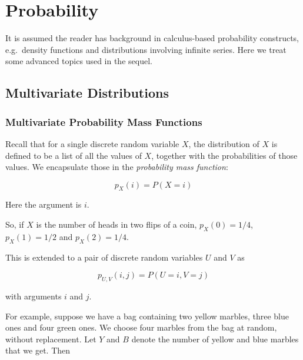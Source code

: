 \chapter{Probability}


It is assumed the reader has background in calculus-based probability
constructs, e.g.\ density functions and distributions involving
infinite series.  Here we treat some advanced topics used in the sequel.

\section{Multivariate Distributions}

\subsection{Multivariate Probability Mass Functions}
\label{marblepmf} 

Recall that for a single discrete random variable $X$, the distribution of
$X$ is defined to be a list of all the values of $X$, together with the
probabilities of those values.  We encapsulate those in the
\textit{probability mass function}:

\begin{equation}
p_X(i) = P(X = i)
\end{equation}

Here the argument is $i$.

So, if $X$ is the number of heads in two flips of a coin, $p_X(0) =
1/4$, $p_X(1) = 1/2$ and $p_X(2) = 1/4$. 

This is extended to a pair of discrete random variables $U$ and $V$ as

\begin{equation}
p_{U,V}(i,j) = P(U = i, V = j)
\end{equation}

with arguments $i$ and $j$.

For example, suppose we have a bag containing two yellow marbles, three
blue ones and four green ones.  We choose four marbles from the bag at
random, without replacement.  Let $Y$ and $B$ denote the number of yellow
and blue marbles that we get.  Then

